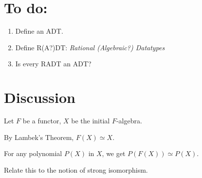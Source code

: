 \documentclass[letterpaper,numbers=enddot]{scrartcl}
\begin{document}
\section{To do:}
\begin{enumerate}
  \item Define an ADT.
  \item Define R(A?)DT: \emph{Rational (Algebraic?) Datatypes}
  \item Is every RADT an ADT?
\end{enumerate}

\section{Discussion}
Let $F$ be a functor, $X$ be the initial $F$-algebra.

By Lambek's Theorem, $F(X) \simeq X$.

For any polynomial $P(X)$ in $X$, we get $P(F(X)) \simeq P(X)$.

Relate this to the notion of strong isomorphism.
\end{document}
